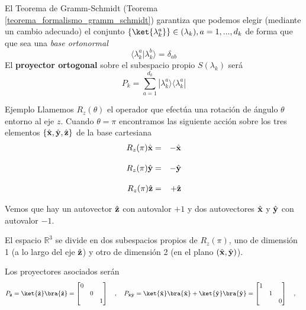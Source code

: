 \documentclass[a4paper,11pt]{book} %
\numberwithin{equation}{chapter}
\newcommand{\braket}[2]{\langle #1|#2\rangle}
\newcommand{\ketbra}[2]{| #1\rangle \! \langle #2|}
\begin{document}
El Teorema de Gramm-Schmidt (Teorema \ref{teorema_formalismo_gramm_schmidt}) garantiza que podemos elegir (mediante un cambio adecuado) el conjunto $\{\ket{\lambda_{k}^a}\}\in (\lambda_k), a=1,...,d_k$ de forma que que sea una  \textit{base ortonormal}
$$
\braket{\lambda_{k}^a}{\lambda_{k}^b}=\delta_{ab}
$$
El \textbf{proyector ortogonal} sobre el subespacio propio $S(\lambda_k)$ será
	\begin{equation} \label{ec_formalismo_proyec_subespacio_propio}
	\boxed{P_k = \sum_{a=1}^{d_k} \ketbra{\lambda_{k}^a}{\lambda_{k}^a}}
	\end{equation}

\begin{mybox_green}{Ejemplo}
Llamemos $R_z(\theta)$ el operador que efectúa una rotación  de ángulo $\theta$ entorno al eje $z$. Cuando $\theta = \pi$ encontramos las siguiente acción sobre los tres elementos $\{\hat{\bf x},\hat{\bf y},\hat{\bf z}\}$
de la base cartesiana
\begin{eqnarray*}
R_z(\pi)\hat{\bf x} &=&-\hat{\bf x}  \\ \rule{0mm}{6mm}
R_z(\pi)\hat{\bf y} &=& -\hat{\bf y}  \\ \rule{0mm}{6mm}
R_z(\pi)\hat{\bf z} &=& + \hat{\bf z}  
\end{eqnarray*}    
\vspace{0.3cm}

Vemos que hay un autovector $\hat{\bf z}$ con autovalor $+1$ y dos autovectores $\hat{\bf x} $ y $\hat{\bf y} $
con autovalor $-1$.
\vspace{0.3cm}

El espacio ${\mathbb R}^3$ se divide en dos subespacios propios de $R_z(\pi)$, uno de dimensión 1 (a lo largo del eje $\hat{\bf z}$) y otro de dimensión 2 (en el plano $(\hat{\bf x},\hat{\bf y})$).
\vspace{0.3cm}

Los proyectores asociados serán
    $$
P_{\hat{\bf z}}= \ket{\hat{\bf z}}\bra{\hat{\bf z}}=\begin{bmatrix} 0 & & \\ & 0 & \\ & & 1 \end{bmatrix}~~~,~~~
P_{\hat{\bf x}\hat{\bf y}}= \ket{\hat{\bf x}}\bra{\hat{\bf x}}+\ket{\hat{\bf y}}\bra{\hat{\bf y}}=\begin{bmatrix} 1 & & \\ & 1 & \\ & & 0 \end{bmatrix}~~~,~~~
$$
\end{mybox_green}
\end{document}
